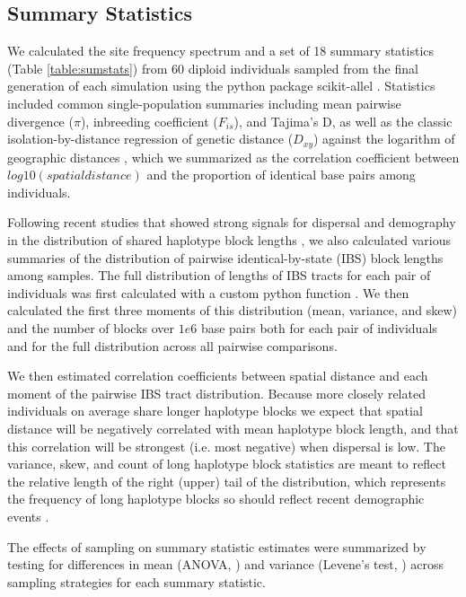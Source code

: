 \documentclass[11pt,twoside,lineno]{preprint}
\newif\ifcomments
\newcommand{\ak}[1]{\ifcomments{{\color{red} \it (#1)}}\else{}\fi}
\begin{document}
\subsection{Summary Statistics}
We calculated the site frequency spectrum and a set of 18 summary statistics (Table \ref{table:sumstats}) from 60 diploid individuals sampled from the final generation of each simulation using the python package scikit-allel \citep{Miles2017}. Statistics included common single-population summaries including mean pairwise divergence ($\pi$), inbreeding coefficient ($F_{is}$), and Tajima's D, as well as the classic isolation-by-distance regression of genetic distance ($D_{xy}$) against the logarithm of geographic distances \citep{Rousset1997}, which we summarized as the correlation coefficient between $log10(spatial distance)$ and the proportion of identical base pairs among individuals. 

Following recent studies that showed strong signals for dispersal and demography in the distribution of shared haplotype block lengths \citep{Ringbauer2017,Baharian2016}, we also calculated various summaries of the distribution of pairwise identical-by-state (IBS) block lengths among samples. The full distribution of lengths of IBS tracts for each pair of individuals was first calculated with a custom python function \ak{point to code on github}. We then calculated the first three moments of this distribution (mean, variance, and skew) and the number of blocks over $1e6$ base pairs both for each pair of individuals and for the full distribution across all pairwise comparisons. 

We then estimated correlation coefficients between spatial distance and each moment of the pairwise IBS tract distribution. Because more closely related individuals on average share longer haplotype blocks we expect that spatial distance will be negatively correlated with mean haplotype block length, and that this correlation will be strongest (i.e. most negative) when dispersal is low. The variance, skew, and count of long haplotype block statistics are meant to reflect the relative length of the right (upper) tail of the distribution, which represents the frequency of long haplotype blocks so should reflect recent demographic events \citep{Ringbauer2017}. 

The effects of sampling on summary statistic estimates were summarized by testing for differences in mean (ANOVA, \citep{Rcore2018}) and variance (Levene's test, \citep{Fox2011}) across sampling strategies for each summary statistic. 
\end{document}
